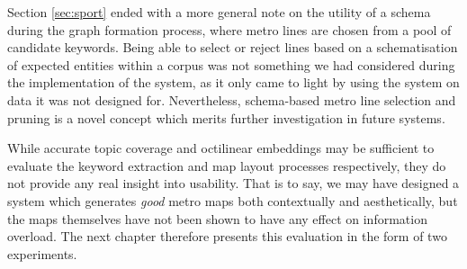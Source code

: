 Section \ref{sec:sport} ended with a more general note on the utility of a schema during the graph formation process, where metro lines are chosen from a pool of candidate keywords. Being able to select or reject lines based on a schematisation of expected entities within a corpus was not something we had considered during the implementation of the system, as it only came to light by using the system on data it was not designed for. Nevertheless, schema-based metro line selection and pruning is a novel concept which merits further investigation in future systems.

While accurate topic coverage and octilinear embeddings may be sufficient to evaluate the keyword extraction and map layout processes respectively, they do not provide any real insight into usability. That is to say, we may have designed a system which generates \textit{good} metro maps both contextually and aesthetically, but the maps themselves have not been shown to have any effect on information overload. The next chapter therefore presents this evaluation in the form of two experiments.

